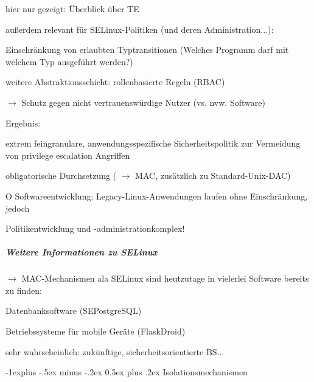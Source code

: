 \documentclass[a4paper]{article}
\makeatletter
\newcommand{\cmark}{\ding{51}}
\newcommand{\xmark}{\ding{55}}
\renewcommand{\subsection}{\@startsection{subsection}{2}{0mm}%
 {-1explus -.5ex minus -.2ex}%
 {0.5ex plus .2ex}%
 {\normalfont\normalsize\bfseries}}
\makeatother
\begin{document}
\begin{multicols}{3}
    \begin{itemize*}
        \item
        hier nur gezeigt: Überblick über TE
        \item
        außerdem relevant für SELinux-Politiken (und deren Administration...):
        \begin{itemize*}
            \item Einschränkung von erlaubten Typtransitionen (Welches Programm darf mit welchem Typ ausgeführt werden?)
            \item weitere Abstraktionsschicht: rollenbasierte Regeln (RBAC)
            \item $\rightarrow$ Schutz gegen nicht vertrauenswürdige Nutzer (vs. nvw. Software)
        \end{itemize*}
        \item
        Ergebnis:
        \begin{itemize*}
            \item \cmark extrem feingranulare, anwendungsspezifische Sicherheitspolitik zur Vermeidung von privilege escalation Angriffen
            \item \cmark obligatorische Durchsetzung ( $\rightarrow$ MAC, zusätzlich zu Standard-Unix-DAC)
            \item O Softwareentwicklung: Legacy-Linux-Anwendungen laufen ohne Einschränkung, jedoch
            \item \xmark Politikentwicklung und -administrationkomplex!
        \end{itemize*}
    \end{itemize*}


    \subparagraph{Weitere Informationen zu
        SELinux}

    $\rightarrow$ MAC-Mechanismen ala SELinux sind
    heutzutage in vielerlei Software bereits zu finden:

    \begin{itemize*}
        \item
        Datenbanksoftware (SEPostgreSQL)
        \item
        Betriebssysteme für mobile Geräte (FlaskDroid)
        \item
        sehr wahrscheinlich: zukünftige, sicherheitsorientierte BS...
    \end{itemize*}


    \subsection{Isolationsmechanismen}


\end{multicols}
\end{document}
